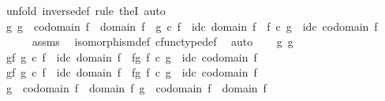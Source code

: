 \begin{isabellebody}
%
\isadelimproof
%
\endisadelimproof
%
\isatagproof
{}\isamarkupfalse%
\ {\isacharparenleft}{\kern0pt}unfold\ inverse{\isacharunderscore}{\kern0pt}def{\isacharcomma}{\kern0pt}\ rule\ theI{\isacharprime}{\kern0pt}{\isacharcomma}{\kern0pt}\ auto{\isacharparenright}{\kern0pt}\isanewline
\ \ \isamarkupfalse%
\ {\isachardoublequoteopen}{\isasymexists}g{\isachardot}{\kern0pt}\ g\ {\isacharcolon}{\kern0pt}\ codomain\ f\ {\isasymrightarrow}\ domain\ f\ {\isasymand}\ g\ {\isasymcirc}\isactrlsub c\ f\ {\isacharequal}{\kern0pt}\ id\isactrlsub c\ {\isacharparenleft}{\kern0pt}domain\ f{\isacharparenright}{\kern0pt}\ {\isasymand}\ f\ {\isasymcirc}\isactrlsub c\ g\ {\isacharequal}{\kern0pt}\ id\isactrlsub c\ {\isacharparenleft}{\kern0pt}codomain\ f{\isacharparenright}{\kern0pt}{\isachardoublequoteclose}\isanewline
\ \ \ \ \isamarkupfalse%
\ assms\ \isamarkupfalse%
\ isomorphism{\isacharunderscore}{\kern0pt}def\ cfunc{\isacharunderscore}{\kern0pt}type{\isacharunderscore}{\kern0pt}def\ \isamarkupfalse%
\ auto\isanewline
{}\isamarkupfalse%
\isanewline
\ \ \isamarkupfalse%
\ g{}\ g{}\isanewline
\ \ \isamarkupfalse%
\ g{}{\isacharunderscore}{\kern0pt}f{\isacharcolon}{\kern0pt}\ {\isachardoublequoteopen}g{}\ {\isasymcirc}\isactrlsub c\ f\ {\isacharequal}{\kern0pt}\ id\isactrlsub c\ {\isacharparenleft}{\kern0pt}domain\ f{\isacharparenright}{\kern0pt}{\isachardoublequoteclose}\ \ f{\isacharunderscore}{\kern0pt}g{}{\isacharcolon}{\kern0pt}\ {\isachardoublequoteopen}f\ {\isasymcirc}\isactrlsub c\ g{}\ {\isacharequal}{\kern0pt}\ id\isactrlsub c\ {\isacharparenleft}{\kern0pt}codomain\ f{\isacharparenright}{\kern0pt}{\isachardoublequoteclose}\isanewline
\ \ \isamarkupfalse%
\ g{}{\isacharunderscore}{\kern0pt}f{\isacharcolon}{\kern0pt}\ {\isachardoublequoteopen}g{}\ {\isasymcirc}\isactrlsub c\ f\ {\isacharequal}{\kern0pt}\ id\isactrlsub c\ {\isacharparenleft}{\kern0pt}domain\ f{\isacharparenright}{\kern0pt}{\isachardoublequoteclose}\ \ f{\isacharunderscore}{\kern0pt}g{}{\isacharcolon}{\kern0pt}\ {\isachardoublequoteopen}f\ {\isasymcirc}\isactrlsub c\ g{}\ {\isacharequal}{\kern0pt}\ id\isactrlsub c\ {\isacharparenleft}{\kern0pt}codomain\ f{\isacharparenright}{\kern0pt}{\isachardoublequoteclose}\isanewline
\ \ \isamarkupfalse%
\ {\isachardoublequoteopen}g{}\ {\isacharcolon}{\kern0pt}\ codomain\ f\ {\isasymrightarrow}\ domain\ f{\isachardoublequoteclose}\ {\isachardoublequoteopen}g{}\ {\isacharcolon}{\kern0pt}\ codomain\ f\ {\isasymrightarrow}\ domain\ f{\isachardoublequoteclose}\isanewline

\end{isabellebody}
